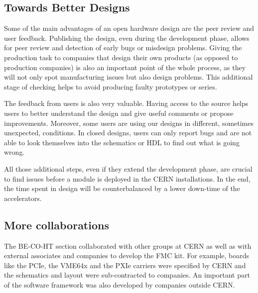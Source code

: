 \documentclass{JAC2003}
\begin{document}
\subsection{Towards Better Designs}
Some of the main advantages of an open hardware design are the peer review and user feedback.
Publishing the design, even during the development phase, allows for peer review and detection of early bugs or misdesign problems.
Giving the production task to companies that design their own products (as opposed to production companies) is also an important point of the whole process, as they will not only spot manufacturing issues but also design problems.
This additional stage of checking helps to avoid producing faulty prototypes or series.

The feedback from users is also very valuable.
Having access to the source helps users to better understand the design and give useful comments or propose improvements.
Moreover, some users are using our designs in different, sometimes unexpected, conditions.
In closed designs, users can only report bugs and are not able to look themselves into the schematics or HDL to find out what is going wrong.

All those additional steps, even if they extend the development phase, are crucial to find issues before a module is deployed in the CERN installations.
In the end, the time spent in design will be counterbalanced by a lower down-time of the accelerators.



\subsection{More collaborations}
The BE-CO-HT section collaborated with other groups at CERN as well as with external associates and companies to develop the FMC kit.
For example, boards like the PCIe, the VME64x and the PXIe carriers were specified by CERN and the schematics and layout were sub-contracted to companies.
An important part of the software framework was also developed by companies outside CERN.
\end{document}
